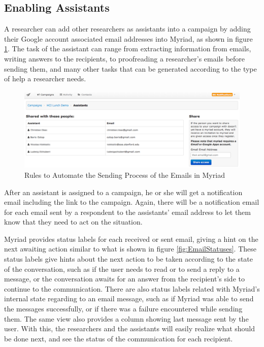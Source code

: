 \subsection{Enabling Assistants}
\label{subsec:5.2.6:EnabAssi}

A researcher can add other researchers as assistants into a campaign by adding their Google account associated email addresses into Myriad, as shown in figure \ref{fig:AddAssistants}. The task of the assistant can range from extracting information from emails, writing answers to the recipients, to proofreading a researcher's emails before sending them, and many other tasks that can be generated according to the type of help a researcher needs.

\clearpage

\begin{figure}[htbp]
	\centering
	\includegraphics[width=1.00\textwidth]{imgs/AddAssistants.png}
	\caption[Rules to Automate the Sending Process of the Emails in Myriad]{Rules to Automate the Sending Process of the Emails in Myriad}
	\label{fig:AddAssistants}
\end{figure}

After an assistant is assigned to a campaign, he or she will get a notification email including the link to the campaign. Again, there will be a notification email for each email sent by a respondent to the assistants' email address to let them know that they need to act on the situation.
\vspace{1cm}

Myriad provides status labels for each received or sent email, giving a hint on the next awaiting action similar to what is shown in figure \ref{fig:EmailStatuses}. These status labels give hints about the next action to be taken according to the state of the conversation, such as if the user needs to read or to send a reply to a message, or the conversation awaits for an answer from the recipient's side to continue to the communication. There are also status labels related with Myriad's internal state regarding to an email message, such as if Myriad was able to send the messages successfully, or if there was a failure encountered while sending them. The same view also provides a column showing last message sent by the user. With this, the researchers and the assistants will easily realize what should be done next, and see the status of the communication for each recipient. 

